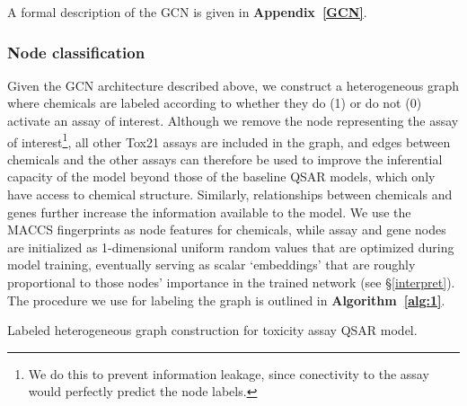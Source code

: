 \documentclass{ws-procs11x85}
\begin{document}
A formal description of the GCN is given in \textbf{Appendix~\ref{GCN}}.

\subsubsection{Node classification}\label{methods-nc}
Given the GCN architecture described above, we construct a heterogeneous graph where chemicals are labeled according to whether they do (1) or do not (0) activate an assay of interest.
Although we remove the node representing the assay of interest\footnote{We do this to prevent information leakage, since conectivity to the assay would perfectly predict the node labels.}, all other Tox21 assays are included in the graph, and edges between chemicals and the other assays can therefore be used to improve the inferential capacity of the model beyond those of the baseline QSAR models, which only have access to chemical structure.
Similarly, relationships between chemicals and genes further increase the information available to the model.
We use the MACCS fingerprints as node features for chemicals, while assay and gene nodes are initialized as 1-dimensional uniform random values that are optimized during model training, eventually serving as scalar `embeddings' that are roughly proportional to those nodes' importance in the trained network (see \S\ref{interpret}).
The procedure we use for labeling the graph is outlined in \textbf{Algorithm~\ref{alg:1}}.

\begin{algorithm}
\caption{Labeled heterogeneous graph construction for toxicity assay QSAR model.}\label{alg:1}
\begin{algorithmic}
   \Else
   \EndIf
\EndFor
{}
\end{algorithmic}
\end{algorithm}
\end{document}
